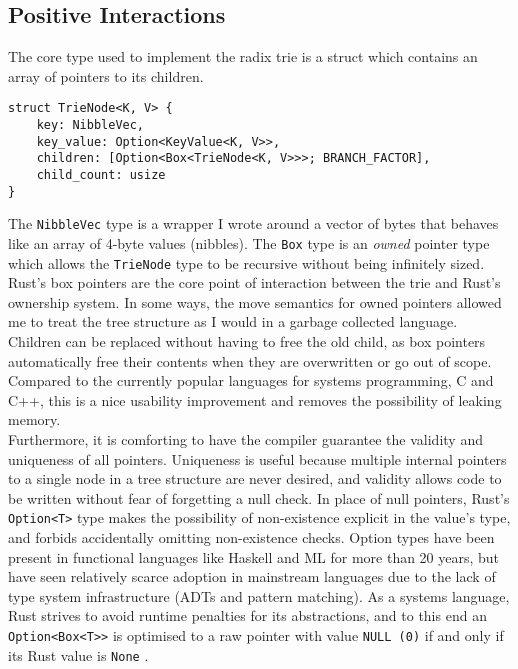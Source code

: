 \documentclass[a4paper,12pt]{article}
\newcommand{\code}[1]{\texttt{#1}}
\begin{document}
\subsection{Positive Interactions}

The core type used to implement the radix trie is a struct which contains an array of pointers to its children.

\begin{verbatim}
struct TrieNode<K, V> {
    key: NibbleVec,
    key_value: Option<KeyValue<K, V>>,
    children: [Option<Box<TrieNode<K, V>>>; BRANCH_FACTOR],
    child_count: usize
}
\end{verbatim}

The \code{NibbleVec} type is a wrapper I wrote around a vector of bytes that behaves like an array of 4-byte values (nibbles). The \code{Box} type is an \textit{owned} pointer type which allows the \code{TrieNode} type to be recursive without being infinitely sized. Rust's box pointers are the core point of interaction between the trie and Rust's ownership system. In some ways, the move semantics for owned pointers allowed me to treat the tree structure as I would in a garbage collected language. Children can be replaced without having to free the old child, as box pointers automatically free their contents when they are overwritten or go out of scope. Compared to the currently popular languages for systems programming, C and C++, this is a nice usability improvement and removes the possibility of leaking memory.\\

Furthermore, it is comforting to have the compiler guarantee the validity and uniqueness of all pointers. Uniqueness is useful because multiple internal pointers to a single node in a tree structure are never desired, and validity allows code to be written without fear of forgetting a null check. In place of null pointers, Rust's \code{Option<T>} type makes the possibility of non-existence explicit in the value's type, and forbids accidentally omitting non-existence checks. Option types have been present in functional languages like Haskell and ML for more than 20 years, but have seen relatively scarce adoption in mainstream languages due to the lack of type system infrastructure (ADTs and pattern matching). As a systems language, Rust strives to avoid runtime penalties for its abstractions, and to this end an \verb;Option<Box<T>>; is optimised to a raw pointer with value \code{NULL (0)} if and only if its Rust value is \code{None} \cite{issue-none-opt}.\\
\end{document}
